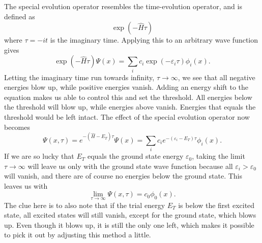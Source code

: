\documentclass[aps,prb,twocolumn,floatfix]{revtex4}
\begin{document}
The special evolution operator resembles the time-evolution operator, and is defined as
\begin{equation}
    \exp \left (- \hat H \tau \right)
\end{equation}
where $\tau = -i t$ is the imaginary time. Applying this to an arbitrary wave function gives
\begin{equation}
    \exp \left (- \hat H \tau \right) \Psi(x) = \sum_i c_i \exp \left( - \varepsilon_i \tau\right) \phi_i(x).
\end{equation}
Letting the imaginary time run towards infinity, $\tau \to \infty$, we see that all negative energies blow up, while positive energies vanish. Adding an energy shift to the equation makes us able to control this and set the threshold. All energies below the threshold will blow up, while energies above vanish. Energies that equals the threshold would be left intact. The effect of the special evolution operator now becomes
\begin{equation}
    \Psi(x, \tau) = e^{- (\hat H - E_T) \tau } \Psi(x) = \sum_i c_i e^{- (\varepsilon_i - E_T) \tau} \phi_i(x).
\end{equation}
If we are so lucky that $E_T$ equals the ground state energy $\varepsilon_0$, taking the limit $\tau \to \infty$ will leave us only with the ground state wave function because all $\varepsilon_i > \varepsilon_0$ will vanish, and there are of course no energies below the ground state. This leaves us with
\begin{equation}
    \lim_{\tau \to \infty} \Psi(x,\tau) = c_0 \phi_0(x) .
\end{equation}
The clue here is to also note that if the trial energy $E_T$ is below the first excited state, all excited states will still vanish, except for the ground state, which blows up. Even though it blows up, it is still the only one left, which makes it possible to pick it out by adjusting this method a little.
\end{document}
